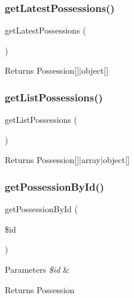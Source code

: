 \subsubsection{\texorpdfstring{getLatestPossessions()}{getLatestPossessions()}}
{\footnotesize\ttfamily get\+Latest\+Possessions (\begin{DoxyParamCaption}{ }\end{DoxyParamCaption})}

\begin{DoxyReturn}{Returns}
Possession\mbox{[}\mbox{]}$\vert$object\mbox{[}\mbox{]} 
\end{DoxyReturn}
\mbox{\label{class_app_1_1_b_l_1_1_possession_manager_a4f4dfb956c9d78f8a141ed33b9710764}} 
\subsubsection{\texorpdfstring{getListPossessions()}{getListPossessions()}}
{\footnotesize\ttfamily get\+List\+Possessions (\begin{DoxyParamCaption}{ }\end{DoxyParamCaption})}

\begin{DoxyReturn}{Returns}
Possession\mbox{[}\mbox{]}$\vert$array$\vert$object\mbox{[}\mbox{]} 
\end{DoxyReturn}
\mbox{\label{class_app_1_1_b_l_1_1_possession_manager_ae4ec518ac8f179af6c4bd26427744ee7}} 
\subsubsection{\texorpdfstring{getPossessionById()}{getPossessionById()}}
{\footnotesize\ttfamily get\+Possession\+By\+Id (\begin{DoxyParamCaption}\item[{}]{\$id }\end{DoxyParamCaption})}


\begin{DoxyParams}{Parameters}
{\em \$id} & \\
\hline
\end{DoxyParams}
\begin{DoxyReturn}{Returns}
Possession 
\end{DoxyReturn}
\mbox{\label{class_app_1_1_b_l_1_1_possession_manager_a779ab2d1dec91b1014ca19aeebefd7bb}} 
